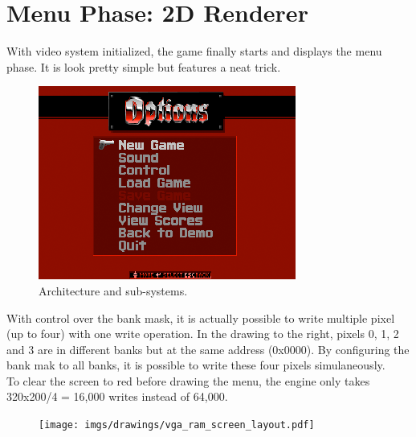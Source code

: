 \section{Menu Phase: 2D Renderer}
With video system initialized, the game finally starts and displays the menu phase. It is look pretty simple but features a neat trick.
\par
\begin{figure}[H]
\centering
\includegraphics[width=\textwidth]{screenshots/first_menu.png}
\caption{Architecture and sub-systems.}
\end{figure}
\par

\begin{minipage}{.6\textwidth}
With control over the bank mask, it is actually possible to write multiple pixel (up to four) with one write operation. In the drawing to the right, pixels 0, 1, 2 and 3 are in different banks but at the same address (0x0000). By configuring the bank mak to all banks, it is possible to write these four pixels simulaneously.\\
To clear the screen to red before drawing the menu, the engine only takes 320x200/4 = 16,000 writes instead of 64,000.\\
\par
\end{minipage}
\begin{minipage}{.4\textwidth}
\begin{figure}[H]
\centering
\texttt{[image: imgs/drawings/vga\_ram\_screen\_layout.pdf]}
\end{figure}
\end{minipage}



